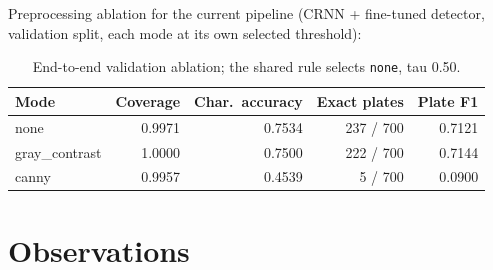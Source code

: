 \documentclass[11pt]{article}
\begin{document}
Preprocessing ablation for the current pipeline (CRNN + fine-tuned detector,
validation split, each mode at its own selected threshold):

\begin{table}[H]
\centering
\begin{tabular}{@{}lrrrr@{}}
\toprule
Mode & Coverage & Char.\ accuracy & Exact plates & Plate F1 \\
\midrule
none & 0.9971 & 0.7534 & 237 / 700 & 0.7121 \\
gray\_contrast & 1.0000 & 0.7500 & 222 / 700 & 0.7144 \\
canny & 0.9957 & 0.4539 & 5 / 700 & 0.0900 \\
\bottomrule
\end{tabular}
\caption{End-to-end validation ablation; the shared rule selects \texttt{none}, tau 0.50.}
\end{table}

\section{Observations}
\end{document}
